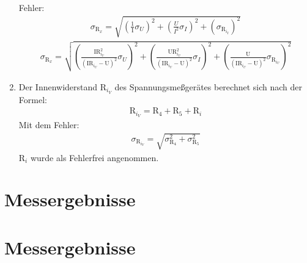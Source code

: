 \documentclass[12pt]{scrartcl}
\begin{document}
\begin{enumerate}
	Fehler:
	\begin{align}
	\sigma_{\text{R}_x}=
	\sqrt{\left(\frac{1}								{\text{I}}\sigma_U\right)^2+
	\left(\frac{U}{I^2}\sigma_I\right)^2+
	\left(\sigma_{\text{R}_{i_I}}\right)^2}
	\label{eqn:aufgabe_3_schaltung_2_sigma}
	\end{align}		
	\begin{align}
	\sigma_{\text{R}_x}=
	\sqrt{\left(\frac{\text{I}
	\text{R}_{i_U}^2}								{(\text{I}\text{R}_{i_U}-
	\text{U})^2}\sigma_U\right)^2+
	\left(\frac{\text{U}\text{R}_{i_U}^2}			{(\text{I}\text{R}_{i_U}-
	\text{U})^2}\sigma_I\right)^2+
	\left(\frac{\text{U}}							{(\text{I}\text{R}_{i_U}-
	\text{U})^2}\sigma_{
	\text{R}_{i_U}}\right)^2}
	\label{eqn:aufgabe_3_schaltung_1_sigma}
	\end{align}	 
	\item
	Der Innenwiderstand R$_{i_V}$ des Spannungsmeßgerätes berechnet sich nach der Formel:
	\begin{align}
	\text{R}_{i_V} = \text{R}_4 + \text{R}_5 + \text{R}_i 
	\label{eqn:aufgabe_4}
	\end{align}
	Mit dem Fehler:
	\begin{align}
	\sigma_{\text{R}_{i_V}} = \sqrt{\sigma_{\text{R}_4}^2 + \sigma_{\text{R}_5}^2}
	\label{eqn:aufgabe_4_sigma}
	\end{align}
	R$_i$ wurde als Fehlerfrei angenommen.
	
\end{enumerate}


\section{Messergebnisse}

\section{Messergebnisse}
\end{document}

